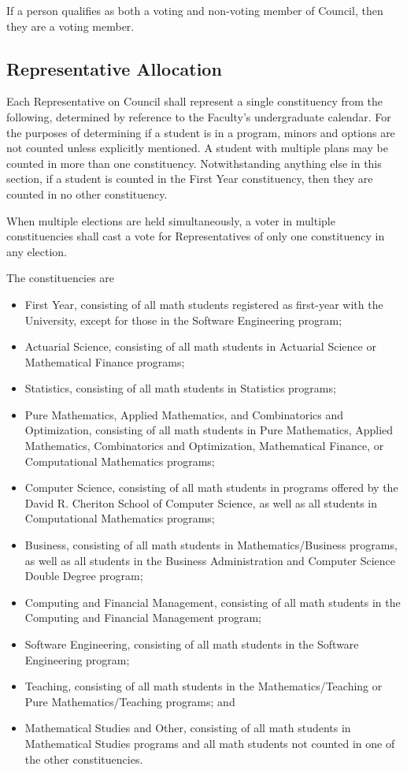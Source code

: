 If a person qualifies as both a voting and non-voting member of Council, then
they are a voting member.

\subsection{Representative Allocation}
Each Representative on Council shall represent a single constituency from the
following, determined by reference to the Faculty's undergraduate calendar. For
the purposes of determining if a student is in a program, minors and options are
not counted unless explicitly mentioned. A student with multiple plans may be
counted in more than one constituency. Notwithstanding anything else in this
section, if a student is counted in the First Year constituency, then they are
counted in no other constituency.

When multiple elections are held simultaneously, a voter in multiple
constituencies shall cast a vote for Representatives of only one constituency in
any election.

The constituencies are
\begin{itemize}
  \item First Year, consisting of all math students registered as first-year
    with the University, except for those in the Software Engineering program;
  \item Actuarial Science, consisting of all math students in Actuarial Science
    or Mathematical Finance programs;
  \item Statistics, consisting of all math students in Statistics programs;
  \item Pure Mathematics, Applied Mathematics, and Combinatorics and
    Optimization, consisting of all math students in Pure Mathematics, Applied
    Mathematics, Combinatorics and Optimization, Mathematical Finance, or
    Computational Mathematics programs;
  \item Computer Science, consisting of all math students in programs offered by
    the David R. Cheriton School of Computer Science, as well as all students in
    Computational Mathematics programs;
  \item Business, consisting of all math students in Mathematics/Business
    programs, as well as all students in the Business Administration and
    Computer Science Double Degree program;
  \item Computing and Financial Management, consisting of all math students in
    the Computing and Financial Management program;
  \item Software Engineering, consisting of all math students in the Software
    Engineering program;
  \item Teaching, consisting of all math students in the
    Mathematics/Teaching or Pure Mathematics/Teaching programs;
    and
  \item Mathematical Studies and Other, consisting of all math students in
    Mathematical Studies programs and all math students not counted in one of
    the other constituencies.
\end{itemize}


